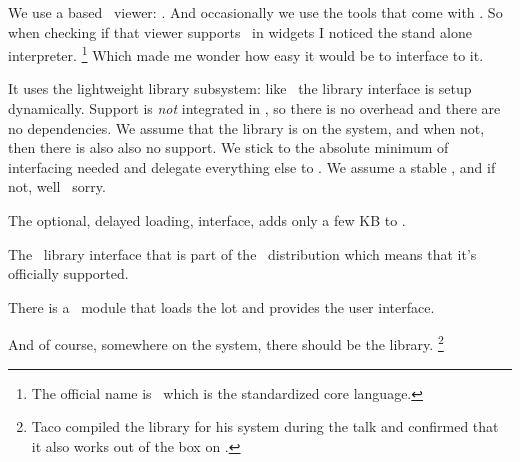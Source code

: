 

\startdocument
  [title={ECMASCRIPT},
   banner={just because it can be done},
   location={context\enspace {\bf 2020}\enspace meeting}]

\starttitle[title=Why oh why]

\startitemize

\startitem
    We use a  based \PDF\ viewer: .
\stopitem
\startitem
    And occasionally we use the tools that come with .
\stopitem
\startitem
    So when checking if that viewer supports \JAVASCRIPT\ in widgets I noticed
    the stand alone interpreter. \footnote {The official name is \ECMASCRIPT\
    which is the standardized core language.}
\stopitem
\startitem
    Which made me wonder how easy it would be to interface to it.
\stopitem

\blank

\startitem
    It uses the lightweight library subsystem: like \FFI\ the library interface
    is setup dynamically.
\stopitem
\startitem
    Support is {\em not} integrated in \LUAMETATEX, so there is no overhead and
    there are no dependencies.
\stopitem
\startitem
    We assume that the library is on the system, and when not, then there is also
    also no support.
\stopitem
\startitem
    We stick to the absolute minimum of interfacing needed and delegate
    everything else to \LUA.
\stopitem
\startitem
    We assume a stable \API, and if not, well \unknown\ sorry.
\stopitem

\stopitemize

\stoptitle

\starttitle[title=The components]

\startitemize

\startitem
    The optional, delayed loading, interface, adds only a few KB to \LUAMETATEX.
\stopitem

\startitem
    The \LUA\ library interface that is part of the \CONTEXT\ distribution which means
    that it's officially supported.
\stopitem

\startitem
    There is a \TEX\ module that loads the lot and provides the user interface.
\stopitem

\startitem
    And of course, somewhere on the system, there should be the 
    library. \footnote {Taco compiled the library for his system during the talk
    and confirmed that it also works out of the box on \OSX.}
\stopitem

